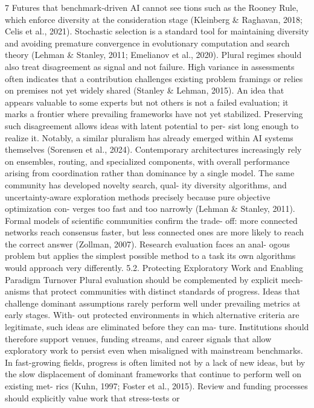 7
Futures that benchmark-driven AI cannot see
tions such as the Rooney Rule, which enforce diversity at
the consideration stage (Kleinberg \& Raghavan, 2018; Celis
et al., 2021). Stochastic selection is a standard tool for
maintaining diversity and avoiding premature convergence
in evolutionary computation and search theory (Lehman \&
Stanley, 2011; Emelianov et al., 2020).
Plural regimes should also treat disagreement as signal and
not failure. High variance in assessments often indicates
that a contribution challenges existing problem framings or
relies on premises not yet widely shared (Stanley \& Lehman,
2015). An idea that appears valuable to some experts but not
others is not a failed evaluation; it marks a frontier where
prevailing frameworks have not yet stabilized. Preserving
such disagreement allows ideas with latent potential to per-
sist long enough to realize it.
Notably, a similar pluralism has already emerged within AI
systems themselves (Sorensen et al., 2024). Contemporary
architectures increasingly rely on ensembles, routing, and
specialized components, with overall performance arising
from coordination rather than dominance by a single model.
The same community has developed novelty search, qual-
ity diversity algorithms, and uncertainty-aware exploration
methods precisely because pure objective optimization con-
verges too fast and too narrowly (Lehman \& Stanley, 2011).
Formal models of scientific communities confirm the trade-
off: more connected networks reach consensus faster, but
less connected ones are more likely to reach the correct
answer (Zollman, 2007). Research evaluation faces an anal-
ogous problem but applies the simplest possible method to
a task its own algorithms would approach very differently.
5.2. Protecting Exploratory Work and Enabling
Paradigm Turnover
Plural evaluation should be complemented by explicit mech-
anisms that protect communities with distinct standards of
progress. Ideas that challenge dominant assumptions rarely
perform well under prevailing metrics at early stages. With-
out protected environments in which alternative criteria are
legitimate, such ideas are eliminated before they can ma-
ture. Institutions should therefore support venues, funding
streams, and career signals that allow exploratory work to
persist even when misaligned with mainstream benchmarks.
In fast-growing fields, progress is often limited not by a lack
of new ideas, but by the slow displacement of dominant
frameworks that continue to perform well on existing met-
rics (Kuhn, 1997; Foster et al., 2015). Review and funding
processes should explicitly value work that stress-tests or
